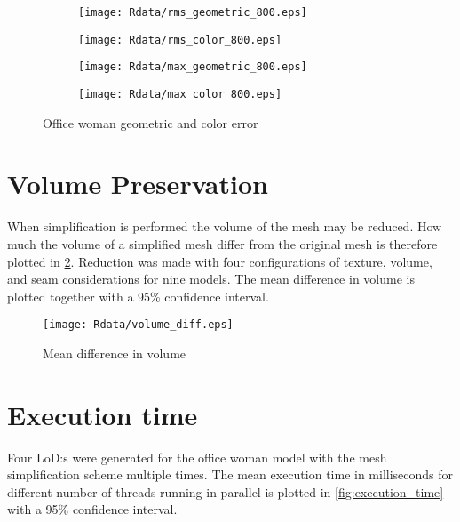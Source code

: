 \begin{figure}[ht]
  \centering
  \begin{subfigure}[b]{.49\textwidth}
    \texttt{[image: Rdata/rms\_geometric\_800.eps]}
  \end{subfigure}
  \hfill
  \begin{subfigure}[b]{.49\textwidth}
    \texttt{[image: Rdata/rms\_color\_800.eps]}
  \end{subfigure}

  \begin{subfigure}[b]{.49\textwidth}
    \texttt{[image: Rdata/max\_geometric\_800.eps]}
  \end{subfigure}
  \hfill
  \begin{subfigure}[b]{.49\textwidth}
    \texttt{[image: Rdata/max\_color\_800.eps]}
  \end{subfigure}
  \caption{Office woman geometric and color error}
  \label{fig:geo_col_error}
\end{figure}

\clearpage
        
\section{Volume Preservation}
When simplification is performed the volume of the mesh may be reduced. How much the volume of a simplified mesh differ from the original mesh is therefore plotted in \cref{fig:volume_diff}. Reduction was made with four configurations of texture, volume, and seam considerations for nine models. The mean difference in volume is plotted together with a 95\% confidence interval.

\begin{figure}[ht]
  \centering
  \texttt{[image: Rdata/volume\_diff.eps]}
  \caption{Mean difference in volume}
  \label{fig:volume_diff}
\end{figure}

\clearpage

\section{Execution time}
Four LoD:s were generated for the office woman model with the mesh simplification scheme multiple times. The mean execution time in milliseconds for different number of threads running in parallel is plotted in \cref{fig:execution_time} with a 95\% confidence interval.

